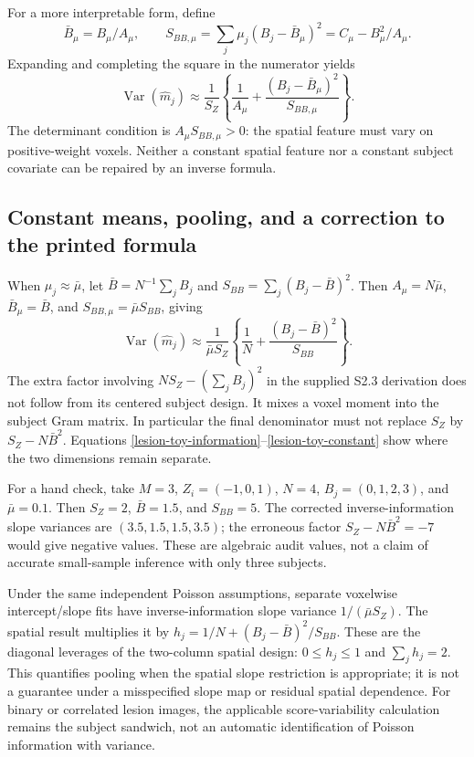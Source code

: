 \documentclass[11pt,a4paper]{article}
\newcommand{\Var}{\operatorname{Var}}
\numberwithin{equation}{section}
\begin{document}
For a more interpretable form, define
\[
 \bar B_\mu=B_\mu/A_\mu,\qquad
 S_{BB,\mu}=\sum_j\mu_j(B_j-\bar B_\mu)^2
           =C_\mu-B_\mu^2/A_\mu.
\]
Expanding and completing the square in the numerator yields
\[
 \Var(\widehat m_j)\approx\frac1{S_Z}
       \left\{\frac1{A_\mu}
                 +\frac{(B_j-\bar B_\mu)^2}{S_{BB,\mu}}\right\}.
\]
The determinant condition is $A_\mu S_{BB,\mu}>0$:
the spatial feature must vary on positive-weight voxels.
Neither a constant spatial feature nor a constant subject covariate
can be repaired by an inverse formula.

\subsection{Constant means, pooling, and a correction to the printed formula}
When $\mu_j\approx\bar\mu$, let
$\bar B=N^{-1}\sum_jB_j$ and
$S_{BB}=\sum_j(B_j-\bar B)^2$.
Then $A_\mu=N\bar\mu$, $\bar B_\mu=\bar B$, and
$S_{BB,\mu}=\bar\mu S_{BB}$, giving
\begin{equation}
 \Var(\widehat m_j)\approx
 \frac1{\bar\mu S_Z}
 \left\{\frac1N+\frac{(B_j-\bar B)^2}{S_{BB}}\right\}.
 \label{lesion-toy-constant}
\end{equation}
The extra factor involving
$NS_Z-(\sum_jB_j)^2$ in the supplied S2.3 derivation does not
follow from its centered subject design. It mixes a voxel moment
into the subject Gram matrix. In particular the final denominator
must not replace $S_Z$ by $S_Z-N\bar B^2$.
Equations \eqref{lesion-toy-information}--\eqref{lesion-toy-constant}
show where the two dimensions remain separate.

For a hand check, take $M=3$, $Z_i=(-1,0,1)$, $N=4$,
$B_j=(0,1,2,3)$, and $\bar\mu=0.1$.
Then $S_Z=2$, $\bar B=1.5$, and $S_{BB}=5$.
The corrected inverse-information slope variances are
$(3.5,1.5,1.5,3.5)$; the erroneous factor
$S_Z-N\bar B^2=-7$ would give negative values.
These are algebraic audit values, not a claim of accurate
small-sample inference with only three subjects.

Under the same independent Poisson assumptions, separate
voxelwise intercept/slope fits have inverse-information slope
variance $1/(\bar\mu S_Z)$.
The spatial result multiplies it by
$h_j=1/N+(B_j-\bar B)^2/S_{BB}$.
These are the diagonal leverages of the two-column spatial
design: $0\le h_j\le1$ and $\sum_jh_j=2$.
This quantifies pooling when the spatial slope restriction is
appropriate; it is not a guarantee under a misspecified slope
map or residual spatial dependence.
For binary or correlated lesion images, the applicable
score-variability calculation remains the subject sandwich,
not an automatic identification of Poisson information with variance.
\end{document}
